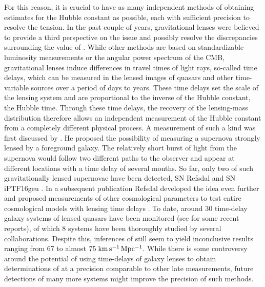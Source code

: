 For this reason, it is crucial to have as many independent methods of obtaining
estimates for the Hubble constant as possible, each with sufficient precision to
resolve the tension.  In the past couple of years, gravitational lenses were
believed to provide a third perspective on the issue and possibly resolve the
discrepancies surrounding the value of \Ho{}.  While other methods are based on
standardizable luminosity measurements or the angular power spectrum of the CMB,
gravitational lenses induce differences in travel times of light rays, so-called
time delays, which can be measured in the lensed images of quasars and other
time-variable sources over a period of days to years.  These time delays set the
scale of the lensing system and are proportional to the inverse of the Hubble
constant, the Hubble time.  Through these time delays, the recovery of the
lensing-mass distribution therefore allows an independent measurement of the
Hubble constant from a completely different physical process.  A measurement of
such a kind was first discussed by .  He proposed the
possibility of measuring a supernova strongly lensed by a foreground galaxy.
The relatively short burst of light from the supernova would follow two
different paths to the observer and appear at different locations with a time
delay of several months. So far, only two of such gravitationally lensed
supernovae have been detected, SN Refsdal and SN iPTF16geu . In a subsequent publication Refsdal developed the idea even further
and proposed measurements of other cosmological parameters to test entire
cosmological models with lensing time delays .  To date,
around 30 time-delay galaxy systems of lensed quasars have been monitored (see
 for some recent reports), of which 8 systems
have been thoroughly studied by several collaborations. Despite this, inferences
of \Ho{} still seem to yield inconclusive results ranging from 67 to almost
$75\;\mathrm{km\,s^{-1}\,Mpc^{-1}}{}$.  While there is some controversy around the potential of
using time-delays of galaxy lenses to obtain determinations of \Ho{} at a
precision comparable to other late measurements, future detections of many more
systems might improve the precision of such methods.

